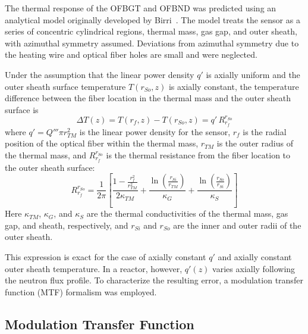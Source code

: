 The thermal response of the OFBGT and OFBND was predicted using an analytical model originally developed by Birri~\cite{Birri2020IEEE, Birri2021Dissertation}.  The model treats the sensor as a series of concentric cylindrical regions, thermal mass, gas gap, and outer sheath, with azimuthal symmetry assumed.  Deviations from azimuthal symmetry due to the heating wire and optical fiber holes are small and were neglected.

Under the assumption that the linear power density $q'$ is axially uniform and the outer sheath surface temperature $T(r_{So}, z)$ is axially constant, the temperature difference between the fiber location in the thermal mass and the outer sheath surface is
\begin{equation}
    \Delta T(z) = T(r_f, z) - T(r_{So}, z) = q' \, R_{r_f}^{r_{So}}
    \label{eq:deltaT}
\end{equation}
where $q' = Q''' \pi r_{TM}^2$ is the linear power density for the sensor, $r_f$ is the radial position of the optical fiber within the thermal mass, $r_{TM}$ is the outer radius of the thermal mass, and $R_{r_f}^{r_{So}}$ is the thermal resistance from the fiber location to the outer sheath surface:
\begin{equation}
    R_{r_f}^{r_{So}} = \frac{1}{2\pi} \left[ \frac{\displaystyle 1 - \frac{r_f^2}{r_{TM}^2}}{2\kappa_{TM}} + \frac{\displaystyle \ln\left(\frac{r_{Si}}{r_{TM}}\right)}{\kappa_G} + \frac{\displaystyle \ln\left(\frac{r_{So}}{r_{Si}}\right)}{\kappa_S} \right]
    \label{eq:thermal_resistance}
\end{equation}
Here $\kappa_{TM}$, $\kappa_G$, and $\kappa_S$ are the thermal conductivities of the thermal mass, gas gap, and sheath, respectively, and $r_{Si}$ and $r_{So}$ are the inner and outer radii of the outer sheath.

This expression is exact for the case of axially constant $q'$ and axially constant outer sheath temperature.  In a reactor, however, $q'(z)$ varies axially following the neutron flux profile.  To characterize the resulting error, a modulation transfer function (MTF) formalism was employed.

\subsection{Modulation Transfer Function}
\label{sec:MTF}

